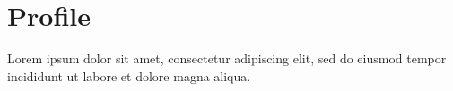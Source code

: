 \makemasthead

\section{Profile}
Lorem ipsum dolor sit amet, consectetur adipiscing elit, sed do eiusmod
tempor incididunt ut labore et dolore magna aliqua.

